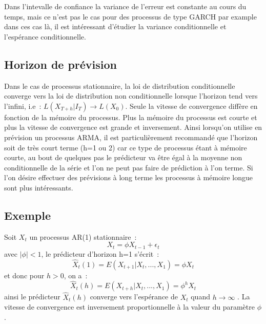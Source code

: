 \documentclass[11pt]{scrartcl} %
\begin{document}
Dans l'intevalle de confiance la variance de l'erreur est constante au cours du temps, mais ce n'est pas le cas pour des processus de type GARCH par example dans ces cas là, il est intéressant d'étudier la variance conditionnelle et l'espérance conditionnelle.
\subsection{Horizon de prévision}
Dans le cas de processus stationnaire, la loi de distribution conditionnelle converge vers la loi de distribution non conditionnelle lorsque l'horizon tend vers l'infini, i.e~: $L(X_{T+h}|I_T)\rightarrow L(X_0)$. Seule la vitesse de convergence diffère en fonction de la mémoire du processus. Plus la mémoire du processus est courte et plus la vitesse de convergence est grande et inversement.
Ainsi lorsqu'on utilise en prévision un processus ARMA, il est particulièrement recommandé que l'horizon soit de très court terme (h=1 ou 2) car ce type de processus étant à mémoire courte, au bout de quelques pas le prédicteur va être égal à la moyenne non conditionnelle de la série et l'on ne peut pas faire de prédiction à l'on terme. Si l'on désire effectuer des prévisions à long terme les processus à mémoire longue sont plus intéressants. 

\subsection*{Exemple}
Soit $X_t$ un processus AR(1) stationnaire~:
$$
X_t = \phi X_{t-1}+\epsilon_t
$$
avec $|\phi|<1$, le prédicteur d'horizon h=1 s'écrit~:
$$
\hat{X}_t(1)=E(X_{t+1}|X_t,...,X_1)=\phi X_t
$$
et donc pour $h>0$, on a~:
$$
\hat{X}_t(h)=E(X_{t+h}|X_t,...,X_1)=\phi^hX_t
$$
ainsi le prédicteur $\hat{X}_t(h)$ converge vers l'espérance de $X_t$ quand $h\rightarrow \infty$ . La vitesse de convergence est inversement proportionnelle à la valeur du paramètre $\phi$. 
\end{document}
